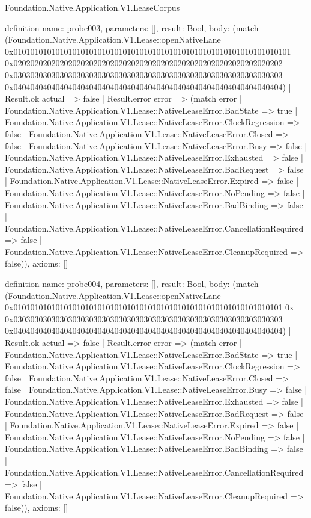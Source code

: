 \begin{lexlean}{Foundation.Native.Application.V1.LeaseCorpus}
\begin{semanticmodule}
definition{
  name: probe003,
  parameters: [],
  result: Bool,
  body: (match (Foundation.Native.Application.V1.Lease::openNativeLane 0x010101010101010101010101010101010101010101010101010101010101010101 0x0202020202020202020202020202020202020202020202020202020202020202 0x0303030303030303030303030303030303030303030303030303030303030303 0x0404040404040404040404040404040404040404040404040404040404040404)
    | Result.ok actual => false
    | Result.error error => (match error
      | Foundation.Native.Application.V1.Lease::NativeLeaseError.BadState => true
      | Foundation.Native.Application.V1.Lease::NativeLeaseError.ClockRegression => false
      | Foundation.Native.Application.V1.Lease::NativeLeaseError.Closed => false
      | Foundation.Native.Application.V1.Lease::NativeLeaseError.Busy => false
      | Foundation.Native.Application.V1.Lease::NativeLeaseError.Exhausted => false
      | Foundation.Native.Application.V1.Lease::NativeLeaseError.BadRequest => false
      | Foundation.Native.Application.V1.Lease::NativeLeaseError.Expired => false
      | Foundation.Native.Application.V1.Lease::NativeLeaseError.NoPending => false
      | Foundation.Native.Application.V1.Lease::NativeLeaseError.BadBinding => false
      | Foundation.Native.Application.V1.Lease::NativeLeaseError.CancellationRequired => false
      | Foundation.Native.Application.V1.Lease::NativeLeaseError.CleanupRequired => false)),
  axioms: []
}

definition{
  name: probe004,
  parameters: [],
  result: Bool,
  body: (match (Foundation.Native.Application.V1.Lease::openNativeLane 0x0101010101010101010101010101010101010101010101010101010101010101 0x 0x0303030303030303030303030303030303030303030303030303030303030303 0x0404040404040404040404040404040404040404040404040404040404040404)
    | Result.ok actual => false
    | Result.error error => (match error
      | Foundation.Native.Application.V1.Lease::NativeLeaseError.BadState => true
      | Foundation.Native.Application.V1.Lease::NativeLeaseError.ClockRegression => false
      | Foundation.Native.Application.V1.Lease::NativeLeaseError.Closed => false
      | Foundation.Native.Application.V1.Lease::NativeLeaseError.Busy => false
      | Foundation.Native.Application.V1.Lease::NativeLeaseError.Exhausted => false
      | Foundation.Native.Application.V1.Lease::NativeLeaseError.BadRequest => false
      | Foundation.Native.Application.V1.Lease::NativeLeaseError.Expired => false
      | Foundation.Native.Application.V1.Lease::NativeLeaseError.NoPending => false
      | Foundation.Native.Application.V1.Lease::NativeLeaseError.BadBinding => false
      | Foundation.Native.Application.V1.Lease::NativeLeaseError.CancellationRequired => false
      | Foundation.Native.Application.V1.Lease::NativeLeaseError.CleanupRequired => false)),
  axioms: []
}


\end{semanticmodule}
\end{lexlean}
